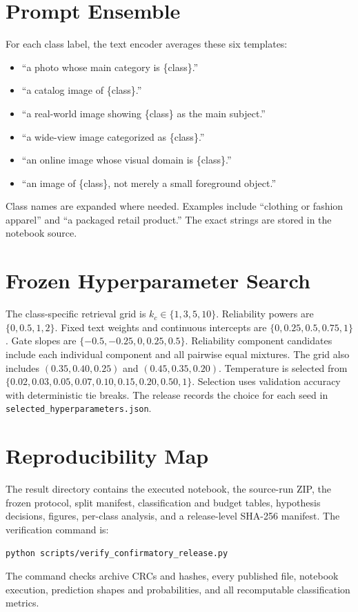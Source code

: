 \documentclass[10pt,twocolumn]{article}
\begin{document}



\appendix
\section{Prompt Ensemble}

For each class label, the text encoder averages these six templates:
\begin{itemize}
  \item ``a photo whose main category is \{class\}.''
  \item ``a catalog image of \{class\}.''
  \item ``a real-world image showing \{class\} as the main subject.''
  \item ``a wide-view image categorized as \{class\}.''
  \item ``an online image whose visual domain is \{class\}.''
  \item ``an image of \{class\}, not merely a small foreground object.''
\end{itemize}
Class names are expanded where needed. Examples include ``clothing or fashion apparel''
and ``a packaged retail product.'' The exact strings are stored in the notebook source.

\section{Frozen Hyperparameter Search}

The class-specific retrieval grid is $k_c\in\{1,3,5,10\}$. Reliability powers are
$\{0,0.5,1,2\}$. Fixed text weights and continuous intercepts are
$\{0,0.25,0.5,0.75,1\}$. Gate slopes are
$\{-0.5,-0.25,0,0.25,0.5\}$. Reliability component candidates include each individual
component and all pairwise equal mixtures. The grid also includes
$(0.35,0.40,0.25)$ and $(0.45,0.35,0.20)$. Temperature is selected from
$\{0.02,0.03,0.05,0.07,0.10,0.15,0.20,0.50,1\}$. Selection uses validation accuracy
with deterministic tie breaks. The release records the choice for each seed in
\texttt{selected\_hyperparameters.json}.

\section{Reproducibility Map}

The result directory contains the executed notebook, the source-run ZIP, the frozen
protocol, split manifest, classification and budget tables, hypothesis decisions,
figures, per-class analysis, and a release-level SHA-256 manifest. The verification
command is:
\begin{verbatim}
python scripts/verify_confirmatory_release.py
\end{verbatim}
The command checks archive CRCs and hashes, every published file, notebook execution,
prediction shapes and probabilities, and all recomputable classification metrics.
\end{document}

